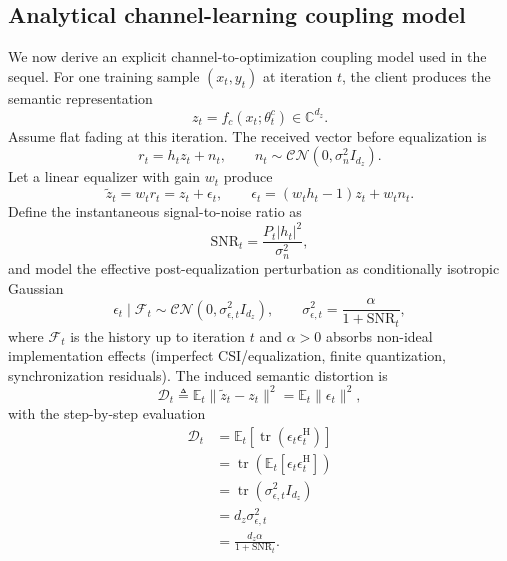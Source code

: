 \documentclass[10pt,journal]{IEEEtran}
\begin{document}
\subsection{Analytical channel-learning coupling model}
We now derive an explicit channel-to-optimization coupling model used in the sequel.
For one training sample $(x_t,y_t)$ at iteration $t$, the client produces the semantic representation
\begin{equation}
z_t = f_c(x_t;\theta_t^c) \in \mathbb{C}^{d_z}.
\end{equation}
Assume flat fading at this iteration. The received vector before equalization is
\begin{equation}
r_t = h_t z_t + n_t,\qquad
n_t\sim\mathcal{CN}(0,\sigma_n^2 I_{d_z}).
\end{equation}
Let a linear equalizer with gain $w_t$ produce
\begin{equation}
\tilde{z}_t = w_t r_t=z_t + \epsilon_t,
\qquad
\epsilon_t=(w_t h_t-1)z_t+w_t n_t.
\end{equation}
Define the instantaneous signal-to-noise ratio as
\begin{equation}
\mathrm{SNR}_t = \frac{P_t|h_t|^2}{\sigma_n^2},
\end{equation}
and model the effective post-equalization perturbation as conditionally isotropic Gaussian
\begin{equation}
\epsilon_t\mid\mathcal{F}_t \sim \mathcal{CN}(0,\sigma_{\epsilon,t}^2 I_{d_z}),
\qquad
\sigma_{\epsilon,t}^2 = \frac{\alpha}{1+\mathrm{SNR}_t},
\end{equation}
where $\mathcal{F}_t$ is the history up to iteration $t$ and $\alpha>0$ absorbs non-ideal implementation effects (imperfect CSI/equalization, finite quantization, synchronization residuals).
The induced semantic distortion is
\begin{equation}
\mathcal{D}_t
\triangleq
\mathbb{E}_t\|\tilde{z}_t-z_t\|^2=
\mathbb{E}_t\|\epsilon_t\|^2,
\end{equation}
with the step-by-step evaluation
\begin{equation}
\begin{aligned}
\mathcal{D}_t
&=
\mathbb{E}_t\left[\operatorname{tr}(\epsilon_t\epsilon_t^{\mathrm{H}})\right] \\
&=
\operatorname{tr}\!\left(\mathbb{E}_t[\epsilon_t\epsilon_t^{\mathrm{H}}]\right) \\
&=
\operatorname{tr}(\sigma_{\epsilon,t}^2 I_{d_z}) \\
&=
d_z\sigma_{\epsilon,t}^2 \\
&=
\frac{d_z\alpha}{1+\mathrm{SNR}_t}.
\end{aligned}
\end{equation}
\end{document}
